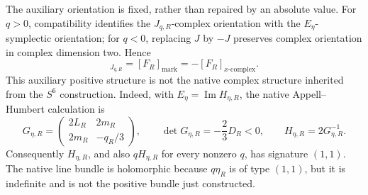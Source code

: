 The auxiliary orientation is fixed, rather than repaired by an absolute value.
For \(q>0\), compatibility identifies the \(J_{q,R}\)-complex orientation
with the \(E_\eta\)-symplectic orientation; for \(q<0\), replacing \(J\) by
\(-J\) preserves complex orientation in complex dimension two.  Hence
\begin{equation}
 [F_R]_{J_{q,R}}=[F_R]_{\mathrm{mark}}
 =-[F_R]_{x\text{-}\mathrm{complex}}.
 \label{cusp-native-full-flux-auxiliary-native-orientations}
\end{equation}
This auxiliary positive structure is not the native complex structure inherited
from the \(S^6\) construction.  Indeed, with \(E_\eta=\operatorname{Im}H_{\eta,R}\),
the native Appell--Humbert calculation is
\begin{equation}
 G_{\eta,R}=
 \begin{pmatrix}
  2L_R&2m_R\\
  2m_R&-q_R/3
 \end{pmatrix},
 \qquad
 \det G_{\eta,R}=-\frac23D_R<0,
 \qquad H_{\eta,R}=2G_{\eta,R}^{-1}.
 \label{cusp-native-full-flux-native-hermitian-signature}
\end{equation}
Consequently \(H_{\eta,R}\), and also \(qH_{\eta,R}\) for every nonzero
\(q\), has signature \((1,1)\).  The native line bundle is holomorphic because
\(q\eta_R\) is of type \((1,1)\), but it is indefinite and is not the positive
bundle just constructed.

